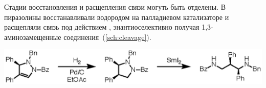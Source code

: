 Стадии восстановления и расщепления связи  могуть быть отделены.
В~\cite{Hashimoto2013} пиразолины восстанавливали водородом на палладиевом катализаторе и расщепляли связь  под действием , энантиоселективно получая 1,3-аминозамещенные соединения~(\ref{sch:cleavage}).

\begin{scheme}
    \centering
    \includegraphics{sections/literature/img/cleavage.eps}
    \caption{}
    \label{sch:cleavage}
\end{scheme}